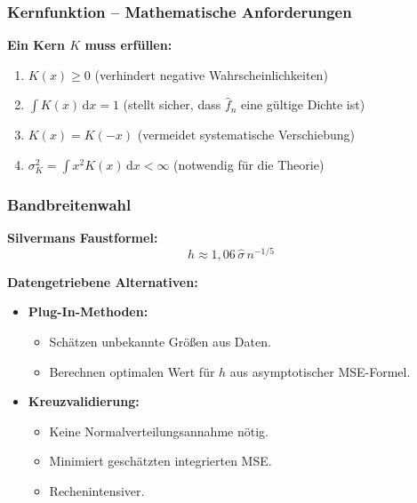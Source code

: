 \documentclass{beamer}
\newif\ifpauseswitch
\begin{document}
	\begin{frame}
		\frametitle{Kernfunktion – Mathematische Anforderungen}
		
		\textbf{Ein Kern $K$ muss erfüllen:}
		
		\begin{enumerate}
			\itemsep10pt
			\item $K(x) \ge 0$ \qquad (verhindert negative Wahrscheinlichkeiten)
			
			\item $\int K(x)\, \mathrm{d}x = 1$ \qquad (stellt sicher, dass $\hat{f}_n$ eine gültige Dichte ist)
			
			\item $K(x) = K(-x)$ \qquad (vermeidet systematische Verschiebung)
			
			\item $\sigma_K^2 = \int x^2 K(x)\, \mathrm{d}x < \infty$ \qquad (notwendig für die Theorie)
		\end{enumerate}
	\end{frame}
	
	
	
	\begin{frame}
		\frametitle{Bandbreitenwahl}
		
		\textbf{Silvermans Faustformel:}
		\[
		h \approx 1{,}06\,\hat{\sigma}\,n^{-1/5}
		\]
		
		\ifpauseswitch
		\pause
		\fi
		
		\vspace{0.5em}
		
		\textbf{Datengetriebene Alternativen:}
		\begin{itemize}
			\itemsep8pt
			\item \textbf{Plug-In-Methoden:}
			\begin{itemize}
				\normalsize
				\item Schätzen unbekannte Größen aus Daten.
				\item Berechnen optimalen Wert für $h$ aus asymptotischer MSE-Formel.
			\end{itemize}
			
			\item \textbf{Kreuzvalidierung:}
			\begin{itemize}
				\normalsize
				\item Keine Normalverteilungsannahme nötig.
				\item Minimiert geschätzten integrierten MSE.
				\item Rechenintensiver.
			\end{itemize}
		\end{itemize}
	\end{frame}
	
\end{document}
